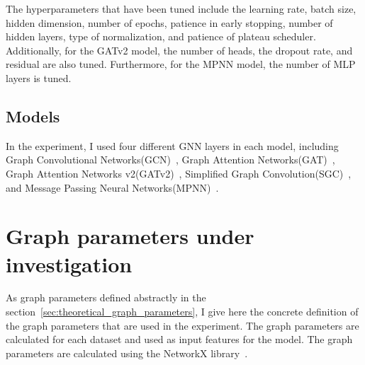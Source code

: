 The hyperparameters that have been tuned include the learning rate, batch size, hidden dimension, number of epochs, patience in early stopping, number of hidden layers, type of normalization, and patience of plateau scheduler. Additionally, for the GATv2 model, the number of heads, the dropout rate, and residual are also tuned. Furthermore, for the MPNN model, the number of MLP layers is tuned.

\subsection{Models}\label{sec:models}
In the experiment, I used four different GNN layers in each model, including Graph Convolutional Networks(GCN)~\cite{kipf2016semi}, Graph Attention Networks(GAT)~\cite{velickovic2020pointer}, Graph Attention Networks v2(GATv2)~\cite{brody2021attentive}, Simplified Graph Convolution(SGC)~\cite{wu2019simplifying}, and Message Passing Neural Networks(MPNN)~\cite{gilmer2017neural}. 

\section{Graph parameters under investigation}\label{sec:practical_graph_parameters}
As graph parameters defined abstractly in the section~\ref{sec:theoretical_graph_parameters}, I give here the concrete definition of the graph parameters that are used in the experiment. The graph parameters are calculated for each dataset and used as input features for the model. The graph parameters are calculated using the NetworkX library~\cite{hagberg2008exploring}.

